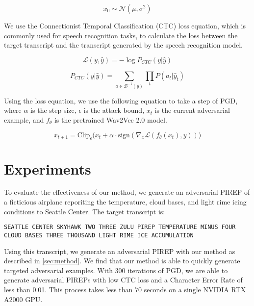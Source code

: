 \begin{equation}
  x_0 \sim \mathcal{N}(\mu, \sigma^2)
  \label{eq:noise}
\end{equation}

We use the Connectionist Temporal Classification (CTC)
\cite{graves2006connectionist} loss equation, which is commonly used for speech
recognition tasks, to calculate the loss between the target transcript and the
transcript generated by the speech recognition model.

\begin{equation}
  \mathcal{L}(y, \hat{y}) = - \log P_{CTC}(y | \hat{y})
\end{equation}

\begin{equation}
  P_{CTC}(y | \hat{y}) = \sum_{a \in \mathcal{B}^{-1}(y)} \prod_{t} P(a_t | \hat{y}_t)
\end{equation}

Using the loss equation, we use the following equation to take a step of PGD,
where $\alpha$ is the step size, $\epsilon$ is the attack bound, $x_t$ is the
current adversarial example, and $f_\theta$ is the pretrained Wav2Vec 2.0 model.

\begin{equation}
  x_{t+1} = \text{Clip}_{\epsilon} \Big( x_t + \alpha \cdot \text{sign} \left( \nabla_{x} \mathcal{L}(f_\theta(x_t), y) \right) \Big)
\end{equation}

\section{Experiments}

To evaluate the effectiveness of our method, we generate an adversarial PIREP
of a ficticious airplane reporiting the temperature, cloud bases, and light rime
icing conditions to Seattle Center. The target transcript is:

\begin{lstlisting}[breaklines]
  SEATTLE CENTER SKYHAWK TWO THREE ZULU PIREP TEMPERATURE MINUS FOUR CLOUD BASES THREE THOUSAND LIGHT RIME ICE ACCUMULATION
\end{lstlisting}

Using this transcript, we generate an adversarial PIREP with our method as
described in \autoref{sec:method}. We find that our method is able to quickly
generate targeted adversarial examples. With 300 iterations of PGD, we are able
to generate adversarial PIREPs with low CTC loss and a Character Error Rate
of less than 0.01. This process takes less than 70 seconds on a single NVIDIA
RTX A2000 GPU.

